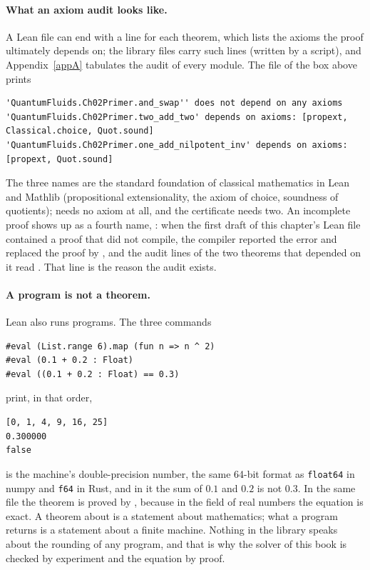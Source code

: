 \paragraph{What an axiom audit looks like.} A Lean file can end with a line  for each theorem, which lists the axioms the proof ultimately depends on; the library files carry such lines (written by a script), and Appendix~\ref{appA} tabulates the
audit of every module. The file of the box above prints
\begin{lstlisting}[style=plainmono]
'QuantumFluids.Ch02Primer.and_swap'' does not depend on any axioms
'QuantumFluids.Ch02Primer.two_add_two' depends on axioms: [propext, Classical.choice, Quot.sound]
'QuantumFluids.Ch02Primer.one_add_nilpotent_inv' depends on axioms: [propext, Quot.sound]
\end{lstlisting}
The three names are the standard foundation of classical mathematics in Lean and Mathlib (propositional extensionality, the axiom of choice, soundness of quotients);
 needs no axiom at all, and the certificate needs two. An incomplete proof shows up as a fourth name, : when the first draft of this chapter's Lean file
contained a proof that did not compile, the compiler reported the error and replaced the proof by , and the audit lines of the two theorems that depended on it read
. That line is the reason the audit exists.

\paragraph{A program is not a theorem.} Lean also runs programs. The three commands
\begin{lstlisting}[style=lean]
#eval (List.range 6).map (fun n => n ^ 2)
#eval (0.1 + 0.2 : Float)
#eval ((0.1 + 0.2 : Float) == 0.3)
\end{lstlisting}
print, in that order,
\begin{lstlisting}[style=plainmono]
[0, 1, 4, 9, 16, 25]
0.300000
false
\end{lstlisting}
 is the machine's double-precision number, the same 64-bit format as \texttt{float64} in numpy and \texttt{f64} in Rust, and in it the sum of $0.1$ and $0.2$ is
not $0.3$. In the same file the theorem  is proved by , because in the field of real numbers the equation is exact.
A theorem about  is a statement about mathematics; what a program returns is a statement about a finite machine. Nothing in the library speaks about the rounding of
any program, and that is why the solver of this book is checked by experiment and the equation by proof.

